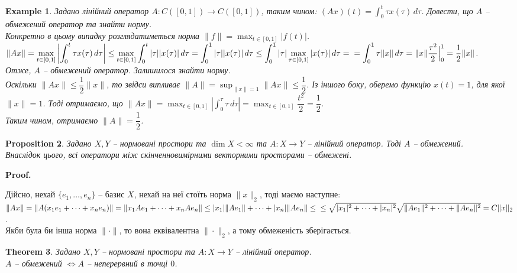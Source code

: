 \documentclass[a4paper, 10pt]{article}
\makeatletter
\theoremstyle{theoremdd}
\newtheorem{theorem}{Theorem}[subsection]
\theoremstyle{theoremdd}
\theoremstyle{theoremdd}
\theoremstyle{theoremdd}
\newtheorem{example}[theorem]{Example}
\theoremstyle{theoremdd}
\newtheorem{proposition}[theorem]{Proposition}
\theoremstyle{theoremdd}
\theoremstyle{theoremdd}
\theoremstyle{theoremdd}
\renewenvironment{proof}[1][Proof.\\]{\par
\pushQED{\hfill \qed}%
\normalfont \topsep6\p@\@plus6\p@\relax
\trivlist
\item\relax
{\bfseries
#1\@addpunct{.}}\hspace\labelsep\ignorespaces
}{%
\popQED\endtrivlist\@endpefalse
}
\makeatother
\begin{document}
\begin{example}
Задано лінійний оператор $A \colon C([0,1]) \to C([0,1])$, таким чином: $(Ax)(t) = \displaystyle\int_0^t \tau x(\tau)\,d\tau$. Довести, що $A$ -- обмежений оператор та знайти норму.\\
Конкретно в цьому випадку розглядатиметься норма $\|f\| = \displaystyle\max_{t \in [0,1]} |f(t)|$.\\
$\displaystyle\|Ax\| = \max_{t \in [0,1]} \left| \int_0^t \tau x(\tau)\,d\tau \right| \leq \max_{t \in [0,1]} \int_0^t |\tau| |x(\tau)|\,d\tau = \int_0^1 |\tau| |x(\tau)|\,d\tau \leq \int_0^1 |\tau| \max_{\tau \in [0,1]} |x(\tau)|\,d\tau = \\
= \int_0^1 \tau \|x \|\,d\tau = \|x\| \dfrac{\tau^2}{2} \Big|_0^1 = \dfrac{1}{2} \|x\|$.\\
Отже, $A$ -- обмежений оператор. Залишилося знайти норму.\\
Оскільки $\|Ax\| \leq \dfrac{1}{2} \|x\|$, то звідси випливає $\|A\| = \displaystyle\sup_{\|x\| = 1} \|Ax\| \leq \dfrac{1}{2}$. Із іншого боку, оберемо функцію $x(t) = 1$, для якої $\|x\| = 1$. Тоді отримаємо, що $\|Ax\| = \displaystyle\max_{t \in [0,1]} \left|\int_0^\tau \tau\,d\tau\right| = \max_{t \in [0,1]} \dfrac{t^2}{2} = \dfrac{1}{2}$.\\
Таким чином, отримаємо $\|A\| = \dfrac{1}{2}$.
\end{example}

\begin{proposition}
Задано $X,Y$ -- нормовані простори та $\dim X < \infty$ та $A \colon X \to Y$ -- лінійний оператор. Тоді $A$ -- обмежений.\\
Внаслідок цього, всі оператори між скінченновимірними векторними просторами -- обмежені.
\end{proposition}

\begin{proof}
Дійсно, нехай $\{e_1,\dots,e_n\}$ -- базис $X$, нехай на неї стоїть норма $\|x\|_2$, тоді маємо наступне:\\
$\|Ax\| = \|A (x_1 e_1 + \dots + x_n e_n) \| = \| x_1 A e_1 + \dots + x_n A e_n \| \leq |x_1| \|A e_1 \| + \dots + |x_n| \|A e_n \| \leq \\
\leq \sqrt{|x_1|^2 + \dots + |x_n|^2} \sqrt{\|Ae_1\|^2 + \dots + \|Ae_n\|^2} = C \|x\|_2$.\\
Якби була би інша норма $\| \cdot \|$, то вона еквівалентна $\| \cdot \|_2$, а тому обмеженість зберігається.
\end{proof}

\begin{theorem}
Задано $X,Y$ -- нормовані простори та $A \colon X \to Y$ -- лінійний оператор.\\
$A$ -- обмежений $\iff A $ -- неперервний в точці $0$.
\end{theorem}
\end{document}
